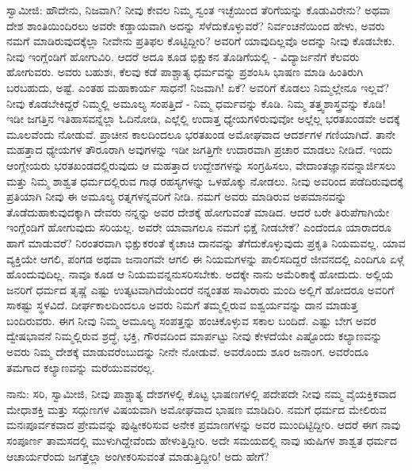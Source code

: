 ಸ್ವಾಮೀಜಿ: ಹೌದೇನು, ನಿಜವಾಗಿ? ನೀವು ಕೇವಲ ನಿಮ್ಮ ಸ್ವಂತ ಇಚ್ಛೆಯಿಂದ ತೆರಿಗೆಯನ್ನು ಕೊಡುವಿರೇನು? ಅಥವಾ ದೇಶ ಶಾಂತಿಯಿಂದಿರಲು ಅವರೇ ಕಡ್ಡಾಯವಾಗಿ ಅದನ್ನು ಸೆಳೆದುಕೊಳ್ಳುವರೆ? ನಿರ್ವಂಚನೆಯಿಂದ ಹೇಳು, ಅವರು ನಮಗೆ ಮಾಡಿರುವುದಕ್ಕೆಲ್ಲಾ ನೀವೇನು ಪ್ರತಿಫಲ ಕೊಟ್ಟಿದ್ದೀರಿ? ಅವರಿಗೆ ಯಾವುದಿಲ್ಲವೊ ಅದನ್ನು ನೀವು ಕೊಡಬೇಕು. ನೀವು ಇಂಗ್ಲೆಂಡಿಗೆ ಹೋಗುವಿರಿ. ಆದರೆ ಅದೂ ಕೂಡ ಭಿಕ್ಷುಕನ ತೊಡಿಗೆಯಲ್ಲಿ - ವಿದ್ಯಾರ್ಜನೆಗೆ ಕೆಲವರು ಹೋಗುವರು. ಅವರು ಬಹುಶಃ, ಕೆಲವು ಕಡೆ ಪಾಶ್ಚಾತ್ಯ ಧರ್ಮವನ್ನು ಪ್ರಶಂಸಿಸಿ ಭಾಷಣ ಮಾಡಿ ಹಿಂತಿರುಗಿ ಬರಬಹುದು, ಅಷ್ಟೆ. ಎಂತಹ ಮಹಾಕಾರ್ಯ ಸಾಧನೆ! ನಿಜವಾಗಿ! ಏಕೆ? ಅವರಿಗೆ ಕೊಡಲು ನಿಮ್ಮಲ್ಲೇನೂ ಇಲ್ಲವೆ? ನೀವು ಕೊಡಬೇಕಿದ್ದರೆ ನಿಮ್ಮಲ್ಲಿ ಅಮೂಲ್ಯ ಸಂಪತ್ತಿದೆ - ನಿಮ್ಮ ಧರ್ಮವನ್ನು ಕೊಡಿ. ನಿಮ್ಮ ತತ್ತ್ವಶಾಸ್ತ್ರವನ್ನು ಕೊಡಿ! ಇಡೀ ಜಗತ್ತಿನ ಇತಿಹಾಸವನ್ನೆಲ್ಲಾ ಓದಿನೋಡಿ, ಎಲ್ಲೆಲ್ಲಿ ಉದಾತ್ತ ಧ್ಯೇಯಗಳಿರುವುವೋ ಅಲ್ಲೆಲ್ಲ ಭರತಖಂಡವೇ ಅದಕ್ಕೆ ಮೂಲವೆಂದು ನೋಡುವೆ. ಪ್ರಾಚೀನ ಕಾಲದಿಂದಲೂ ಭರತಖಂಡ ಅಮೋಘವಾದ ಆದರ್ಶಗಳ ಗಣಿಯಾಗಿದೆ. ತಾನೇ ಮಹತ್ತಾದ ಧ್ಯೇಯಗಳ ತೌರೂರಾಗಿ ಅವುಗಳನ್ನು ಇಡೀ ಜಗತ್ತಿಗೇ ಉದಾರವಾಗಿ ಪ್ರಚಾರ ಮಾಡಲು ನೀಡಿದೆ. ಇಂದು ಆಂಗ್ಲೇಯರು ಭರತಖಂಡದಲ್ಲಿರುವುದು ಆ ಮಹತ್ತಾದ ಉದ್ದೇಶಗಳನ್ನು ಸಂಗ್ರಹಿಸಲು, ವೇದಾಂತಜ್ಞಾನವನ್ನಾರ್ಜಿಸಲು ಮತ್ತು ನಿಮ್ಮ ಶಾಶ್ವತ ಧರ್ಮದಲ್ಲಿರುವ ಗಾಢ ರಹಸ್ಯಗಳನ್ನು ಒಳಹೊಕ್ಕು ನೋಡಲು. ನೀವು ಅವರಿಂದ ಪಡೆದಿರುವುದಕ್ಕೆ ಪ್ರತಿಯಾಗಿ ನೀವು ಈ ಅಮೂಲ್ಯ ರತ್ನಗಳನ್ನವರಿಗೆ ನೀಡಿ. ನಮಗೆ ಅವರು ಮಾಡಿರುವ ಅಪಮಾನವನ್ನು ತೊಡೆದುಹಾಕುವುದಕ್ಕಾಗಿ ದೇವರು ನನ್ನನ್ನು ಅವರ ದೇಶಕ್ಕೆ ಹೋಗುವಂತೆ ಮಾಡಿದ. ಆದರೆ ಬರೇ ತಿರುಪೆಗಾಗಿಯೇ ಇಂಗ್ಲೆಂಡಿಗೆ ಹೋಗುವುದು ಸರಿಯಲ್ಲ. ಅವರೇ ಯಾವಾಗಲೂ ನಮಗೆ ಭಿಕ್ಷೆ ನೀಡಬೇಕೆ? ಎಂದೆಂದೂ ಯಾರಾದರೂ ಹಾಗೆ ಮಾಡುವರೆ? ನಿರಂತರವಾಗಿ ಭಿಕ್ಷುಕರಂತೆ ಕೈಚಾಚಿ ದಾನವನ್ನು ತೆಗೆದುಕೊಳ್ಳುವುದು ಪ್ರಕೃತಿ ನಿಯಮವಲ್ಲ. ಯಾವ ವ್ಯಕ್ತಿಯೇ ಆಗಲಿ, ಪಂಗಡ ಅಥವಾ ಜನಾಂಗವೇ ಆಗಲಿ ಈ ನಿಯಮಗಳನ್ನು ಪಾಲಿಸದಿದ್ದರೆ ಜೀವನದಲ್ಲಿ ಎಂದಿಗೂ ಏಳ್ಗೆ ಹೊಂದುವುದಿಲ್ಲ. ನಾವೂ ಕೂಡ ಆ ನಿಯಮವನ್ನನುಸರಿಸಬೇಕು. ಅದಕ್ಕೇ ನಾನು ಅಮೆರಿಕಾಕ್ಕೆ ಹೋದುದು. ಅಲ್ಲಿಯ ಜನರಿಗೆ ಧರ್ಮದ ತೃಷ್ಣೆ ಎಷ್ಟು ಉತ್ಕಟವಾಗಿದೆಯೆಂದರೆ ನನ್ನಂತಹ ಸಾವಿರಾರು ಮಂದಿ ಅಲ್ಲಿಗೆ ಹೋದರೂ ಅವರಿಗೆ ಸಾಕಷ್ಟು ಸ್ಥಳವಿದೆ. ದೀರ್ಘಕಾಲದಿಂದಲೂ ಅವರು ನಿಮಗೆ ತಮ್ಮಲ್ಲಿರುವ ಐಶ್ವರ್ಯವನ್ನು ದಾನ ಮಾಡುತ್ತ ಬಂದಿರುವರು. ಈಗ ನೀವು ನಿಮ್ಮ ಅಮೂಲ್ಯ ಸಂಪತ್ತನ್ನು ಹಂಚಿಕೊಳ್ಳುವ ಸಕಾಲ ಬಂದಿದೆ. ಎಷ್ಟು ಬೇಗ ಅವರ ದ್ವೇಷಭಾವನೆ ನಿಮ್ಮಲ್ಲಿರುವ ಶ್ರದ್ಧೆ, ಭಕ್ತಿ, ಗೌರವದಿಂದ ಮಾರ್ಪಟ್ಟು ನೀವು ಕೇಳದೆಯೇ ಎಷ್ಟೊಂದು ಕಲ್ಯಾಣವನ್ನು ಅವರು ನಿಮ್ಮ ದೇಶಕ್ಕೆ ಮಾಡುವರೆಂಬುದನ್ನು ನೀನೇ ನೋಡುವೆ. ಅವರೊಂದು ಶೂರ ಜನಾಂಗ. ಅವರೆಂದೂ ತಮಗಾದ ಕಲ್ಯಾಣವನ್ನು ಮರೆಯುವವರಲ್ಲ.

ನಾನು: ಸರಿ, ಸ್ವಾಮೀಜಿ, ನೀವು ಪಾಶ್ಚಾತ್ಯ ದೇಶಗಳಲ್ಲಿ ಕೊಟ್ಟ ಭಾಷಣಗಳಲ್ಲಿ ಪದೇಪದೇ ನೀವು ನಮ್ಮ ವೈಯಕ್ತಿಕವಾದ ಮೇಧಾಶಕ್ತಿ ಮತ್ತು ಸದ್ಗುಣಗಳ ವಿಷಯವಾಗಿ ಅಮೋಘವಾದ ಭಾಷಣ ಮಾಡಿದಿರಿ. ನಮಗೆ ಧರ್ಮದ ಮೇಲಿರುವ ಮನಃಪೂರ್ವಕವಾದ ಪ್ರೇಮವನ್ನು ಪುಷ್ಟೀಕರಿಸುವ ಅನೇಕ ಪ್ರಮಾಣಗಳನ್ನು ಅವರ ಮುಂದಿಟ್ಟಿದ್ದೀರಿ. ಆದರೆ ಈಗ ನಾವು ಸಂಪೂರ್ಣ ತಾಮಸದಲ್ಲಿ ಮುಳುಗಿದ್ದೇವೆಂದು ಹೇಳುತ್ತಿದ್ದೀರಿ. ಅದೇ ಸಮಯದಲ್ಲಿ ನಾವು ಋಷಿಗಳ ಶಾಶ್ವತ ಧರ್ಮದ ಆಚಾರ್ಯರೆಂದು ಜಗತ್ತೆಲ್ಲಾ ಅಂಗೀಕರಿಸುವಂತೆ ಮಾಡುತ್ತಿದ್ದೀರಿ! ಅದು ಹೇಗೆ?

